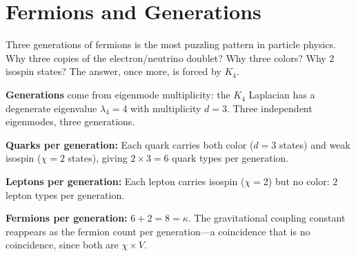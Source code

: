 \documentclass[11pt,a4paper]{book}
\begin{document}
\begin{code}
\AgdaSpace{}%
\<%
\\
\>[0]\AgdaSpace{}%
\AgdaSymbol{=}\AgdaSpace{}%
\<%
\\
%
\\[\AgdaEmptyExtraSkip]%
\>[0]\AgdaSpace{}%
\AgdaSymbol{:}\AgdaSpace{}%
\AgdaSpace{}%
\AgdaSpace{}%
\<%
\\
\>[0]\AgdaSpace{}%
\AgdaSymbol{=}\AgdaSpace{}%
\<%
\\
%
\\[\AgdaEmptyExtraSkip]%
\>[0]\<%
\\
\>[0]\<%
\end{code}

\chapter{Fermions and Generations}
\label{ch:fermions}

Three generations of fermions is the most puzzling pattern in particle physics. Why three copies of the electron/neutrino doublet? Why three colors? Why $2$ isospin states? The answer, once more, is forced by $K_4$.

\textbf{Generations} come from eigenmode multiplicity: the $K_4$ Laplacian has a degenerate eigenvalue $\lambda_4 = 4$ with multiplicity $d = 3$. Three independent eigenmodes, three generations.

\textbf{Quarks per generation:} Each quark carries both color ($d = 3$ states) and weak isospin ($\chi = 2$ states), giving $2 \times 3 = 6$ quark types per generation.

\textbf{Leptons per generation:} Each lepton carries isospin ($\chi = 2$) but no color: $2$ lepton types per generation.

\textbf{Fermions per generation:} $6 + 2 = 8 = \kappa$. The gravitational coupling constant reappears as the fermion count per generation---a coincidence that is no coincidence, since both are $\chi \times V$.
\end{document}
